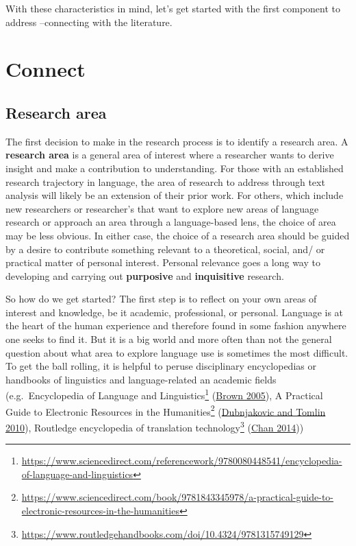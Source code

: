 \documentclass[
  letterpaper,
  DIV=11,
  numbers=noendperiod]{scrreport}
\theoremstyle{definition}
\theoremstyle{remark}
\DeclareRobustCommand{\href}[2]{#2\footnote{\url{#1}}}
\begin{document}
With these characteristics in mind, let's get started with the first
component to address --connecting with the literature.

\hypertarget{sec-fr-connect}{%
\section{Connect}\label{sec-fr-connect}}

\hypertarget{research-area}{%
\subsection{Research area}\label{research-area}}

The first decision to make in the research process is to identify a
research area. A \textbf{research area} is a general area of interest
where a researcher wants to derive insight and make a contribution to
understanding. For those with an established research trajectory in
language, the area of research to address through text analysis will
likely be an extension of their prior work. For others, which include
new researchers or researcher's that want to explore new areas of
language research or approach an area through a language-based lens, the
choice of area may be less obvious. In either case, the choice of a
research area should be guided by a desire to contribute something
relevant to a theoretical, social, and/ or practical matter of personal
interest. Personal relevance goes a long way to developing and carrying
out \textbf{purposive} and \textbf{inquisitive} research.

So how do we get started? The first step is to reflect on your own areas
of interest and knowledge, be it academic, professional, or personal.
Language is at the heart of the human experience and therefore found in
some fashion anywhere one seeks to find it. But it is a big world and
more often than not the general question about what area to explore
language use is sometimes the most difficult. To get the ball rolling,
it is helpful to peruse disciplinary encyclopedias or handbooks of
linguistics and language-related an academic fields
(e.g.~\href{https://www.sciencedirect.com/referencework/9780080448541/encyclopedia-of-language-and-linguistics}{Encyclopedia
of Language and Linguistics} (\protect\hyperlink{ref-Brown2005}{Brown
2005}),
\href{https://www.sciencedirect.com/book/9781843345978/a-practical-guide-to-electronic-resources-in-the-humanities}{A
Practical Guide to Electronic Resources in the Humanities}
(\protect\hyperlink{ref-Dubnjakovic2010}{Dubnjakovic and Tomlin 2010}),
\href{https://www.routledgehandbooks.com/doi/10.4324/9781315749129}{Routledge
encyclopedia of translation technology}
(\protect\hyperlink{ref-Chan2014}{Chan 2014}))
\end{document}
